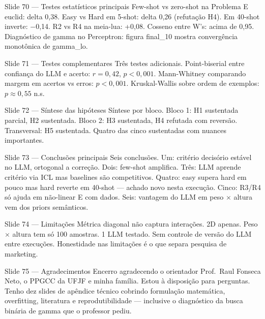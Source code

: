 \documentclass[aspectratio=169,10pt]{beamer}
\begin{document}
\begin{frame}{Slide 70 --- Testes estat\'isticos principais}
\footnotesize
Few-shot vs zero-shot na Problema E euclid: delta 0{,}38. Easy vs Hard em 5-shot: delta 0{,}26 (refuta\c{c}\~ao H4). Em 40-shot inverte: $-$0{,}14. R2 vs R4 na meia-lua: +0{,}08. Cosseno entre W's: acima de 0{,}95. Diagn\'ostico de gamma no Perceptron: figura final\_10 mostra converg\^encia monot\^onica de gamma\_lo.
\end{frame}

\begin{frame}{Slide 71 --- Testes complementares}
\footnotesize
Tr\^es testes adicionais. Point-biserial entre confian\c{c}a do LLM e acerto: $r = 0{,}42$, $p<0{,}001$. Mann-Whitney comparando margem em acertos vs erros: $p<0{,}001$. Kruskal-Wallis sobre ordem de exemplos: $p \approx 0{,}55$ n.s.
\end{frame}

\begin{frame}{Slide 72 --- S\'intese das hip\'oteses}
\footnotesize
S\'intese por bloco. Bloco 1: H1 sustentada parcial, H2 sustentada. Bloco 2: H3 sustentada, H4 refutada com revers\~ao. Transversal: H5 sustentada. Quatro das cinco sustentadas com nuances importantes.
\end{frame}

\begin{frame}{Slide 73 --- Conclus\~oes principais}
\footnotesize
Seis conclus\~oes. Um: crit\'erio decis\'orio est\'avel no LLM, ortogonal a corre\c{c}\~ao. Dois: few-shot amplifica. Tr\^es: LLM aprende crit\'erio via ICL mas baselines s\~ao competitivos. Quatro: easy supera hard em pouco mas hard reverte em 40-shot --- achado novo nesta execu\c{c}\~ao. Cinco: R3/R4 s\'o ajuda em n\~ao-linear E com dados. Seis: vantagem do LLM em peso $\times$ altura vem dos priors sem\^anticos.
\end{frame}

\begin{frame}{Slide 74 --- Limita\c{c}\~oes}
\footnotesize
M\'etrica diagonal n\~ao captura intera\c{c}\~oes. 2D apenas. Peso $\times$ altura tem s\'o 100 amostras. 1 LLM testado. Sem controle de vers\~ao do LLM entre execu\c{c}\~oes. Honestidade nas limita\c{c}\~oes \'e o que separa pesquisa de marketing.
\end{frame}

\begin{frame}{Slide 75 --- Agradecimentos}
\footnotesize
Encerro agradecendo o orientador Prof.\ Raul Fonseca Neto, o PPGCC da UFJF e minha fam\'ilia. Estou \`a disposi\c{c}\~ao para perguntas. Tenho dez slides de ap\^endice t\'ecnico cobrindo formula\c{c}\~ao matem\'atica, overfitting, literatura e reprodutibilidade --- inclusive o diagn\'ostico da busca bin\'aria de gamma que o professor pediu.
\end{frame}
\end{document}

